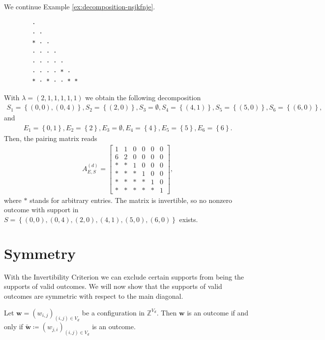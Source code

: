 \begin{example}
    We continue Example \ref{ex:decomposition-nsjkfnje}. 
    \begin{verbatim}
        · 
        · · 
        * · · 
        · · · · 
        · · · · · 
        · · · · * · 
        * · * · · * *
    \end{verbatim}
    With \( \lambda = (2,1,1,1,1,1) \) we obtain the following decomposition
    \begin{align*}
        S_1 = \left\{ (0,0), (0,4) \right\}, S_2 = \left\{ (2,0) \right\}, S_3 = \emptyset, S_4 = \left\{ (4,1) \right\}, S_5 = \left\{ (5,0) \right\}, S_6 = \left\{ (6,0) \right\},
    \end{align*}
    and
    \begin{align*}
        E_1 = \left\{ 0, 1 \right\}, E_2 = \left\{ 2 \right\}, E_3 = \emptyset, E_4 = \left\{ 4 \right\}, E_5 = \left\{ 5 \right\}, E_6 = \left\{ 6 \right\}.
    \end{align*}
    Then, the pairing matrix reads 
    \begin{align*}
        A^{(d)}_{E,S} = \begin{bmatrix}
            1 & 1 & 0 & 0 & 0 & 0 \\
            6 & 2 & 0 & 0 & 0 & 0 \\
            * & * & 1 & 0 & 0 & 0 \\
            * & * & * & 1 & 0 & 0 \\
            * & * & * & * & 1 & 0 \\
            * & * & * & * & * & 1
        \end{bmatrix},
    \end{align*}
    where \( * \) stands for arbitrary entries. The matrix is invertible, so no nonzero outcome with support in \( S = \left\{ (0,0), (0,4), (2,0), (4,1), (5,0), (6,0) \right\} \) exists.
\end{example}

\section{Symmetry}

With the Invertibility Criterion we can exclude certain supports from being the supports of valid outcomes. We will now show that the supports of valid outcomes are symmetric with respect to the main diagonal.

\begin{proposition}\label{prop:symmetry}
    Let \( \mathbf{w} = (w_{i,j})_{(i,j) \in V_d} \) be a configuration in \( \mathbb{Z}^{V_d} \). Then \( \mathbf{w} \) is an outcome if and only if \(  \tilde{\mathbf{w}} \coloneqq (w_{j,i})_{(i,j) \in V_d} \) is an outcome.
\end{proposition}

